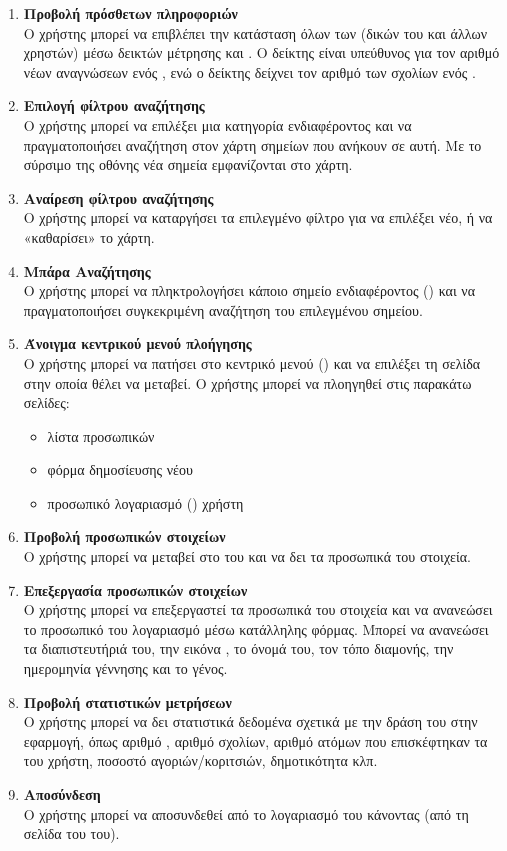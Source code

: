 \begin{enumerate}
    \item \textbf{Προβολή πρόσθετων πληροφοριών } \\
    Ο χρήστης μπορεί να επιβλέπει την κατάσταση όλων των  (δικών του και άλλων χρηστών) μέσω δεικτών μέτρησης  και . Ο δείκτης  είναι υπεύθυνος για τον αριθμό νέων αναγνώσεων ενός , ενώ ο δείκτης  δείχνει τον αριθμό των σχολίων ενός . 
    \item \textbf{Επιλογή φίλτρου αναζήτησης} \\
    Ο χρήστης μπορεί να επιλέξει μια κατηγορία ενδιαφέροντος και να πραγματοποιήσει αναζήτηση στον χάρτη σημείων που ανήκουν σε αυτή. Με το σύρσιμο της οθόνης νέα σημεία εμφανίζονται στο χάρτη.
    \item \textbf{Αναίρεση φίλτρου αναζήτησης} \\
    Ο χρήστης μπορεί να καταργήσει τα επιλεγμένο φίλτρο για να επιλέξει νέο, ή να «καθαρίσει» το χάρτη.
    \item \textbf{Μπάρα Αναζήτησης} \\
    Ο χρήστης μπορεί να πληκτρολογήσει κάποιο σημείο ενδιαφέροντος () και να πραγματοποιήσει συγκεκριμένη αναζήτηση του επιλεγμένου σημείου. 
    \item \textbf{Άνοιγμα κεντρικού μενού πλοήγησης} \\
    Ο χρήστης μπορεί να πατήσει στο κεντρικό μενού () και να επιλέξει τη σελίδα στην οποία θέλει να μεταβεί. Ο χρήστης μπορεί να πλοηγηθεί στις παρακάτω σελίδες:
    \begin{itemize}
        \item λίστα προσωπικών 
        \item φόρμα δημοσίευσης νέου 
        \item προσωπικό λογαριασμό () χρήστη
    \end{itemize}
    \item \textbf{Προβολή προσωπικών στοιχείων} \\
    Ο χρήστης μπορεί να μεταβεί στο  του και να δει τα προσωπικά του στοιχεία.
    \item \textbf{Επεξεργασία προσωπικών στοιχείων} \\
    Ο χρήστης μπορεί να επεξεργαστεί τα προσωπικά του στοιχεία και να ανανεώσει το προσωπικό του λογαριασμό μέσω κατάλληλης φόρμας. Μπορεί να ανανεώσει τα διαπιστευτήριά του, την εικόνα , το όνομά του, τον τόπο διαμονής, την ημερομηνία γέννησης και το γένος.
    \item \textbf{Προβολή στατιστικών μετρήσεων} \\
    Ο χρήστης μπορεί να δει στατιστικά δεδομένα σχετικά με την δράση του στην εφαρμογή, όπως αριθμό , αριθμό σχολίων, αριθμό ατόμων που επισκέφτηκαν τα  του χρήστη, ποσοστό αγοριών/κοριτσιών, δημοτικότητα κλπ. 
    \item \textbf{Αποσύνδεση} \\
    Ο χρήστης μπορεί να αποσυνδεθεί από το λογαριασμό του κάνοντας  (από τη σελίδα του  του).
\end{enumerate}



